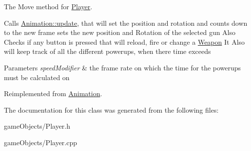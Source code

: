 The Move method for \hyperlink{class_player}{Player}. 

Calls \hyperlink{class_animation_ae17ebf5f4b47801e460eb63342d858e8}{Animation\+::update}, that will set the position and rotation and counts down to the new frame sets the new position and Rotation of the selected gun Also Checks if any button is pressed that will reload, fire or change a \hyperlink{class_weapon}{Weapon} It Also will keep track of all the different powerups, when there time exceeds 
\begin{DoxyParams}{Parameters}
{\em speed\+Modifier} & the frame rate on which the time for the powerups must be calculated on \\
\hline
\end{DoxyParams}


Reimplemented from \hyperlink{class_animation_ae17ebf5f4b47801e460eb63342d858e8}{Animation}.



The documentation for this class was generated from the following files\+:\begin{DoxyCompactItemize}
\item 
game\+Objects/Player.\+h\item 
game\+Objects/Player.\+cpp\end{DoxyCompactItemize}
